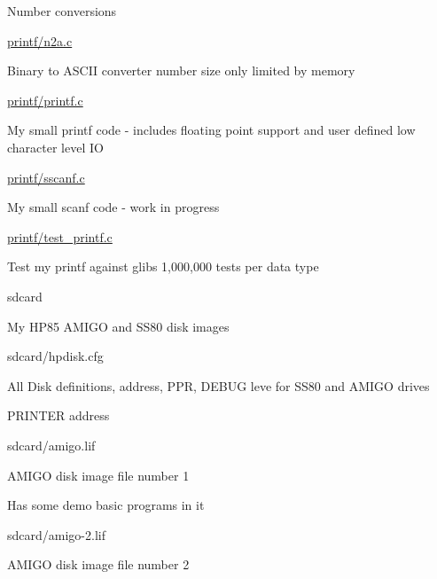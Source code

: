 \begin{DoxyItemize}
\begin{DoxyItemize}
\begin{DoxyItemize}
\item Number conversions
\end{DoxyItemize}
\item \hyperlink{n2a_8c}{printf/n2a.\+c}
\begin{DoxyItemize}
\item Binary to A\+S\+C\+II converter number size only limited by memory
\end{DoxyItemize}
\item \hyperlink{printf_8c}{printf/printf.\+c}
\begin{DoxyItemize}
\item My small printf code -\/ includes floating point support and user defined low character level IO
\end{DoxyItemize}
\item \hyperlink{sscanf_8c}{printf/sscanf.\+c}
\begin{DoxyItemize}
\item My small scanf code -\/ work in progress
\end{DoxyItemize}
\item \hyperlink{test__printf_8c}{printf/test\+\_\+printf.\+c}
\begin{DoxyItemize}
\item Test my printf against glibs 1,000,000 tests per data type
\end{DoxyItemize}
\end{DoxyItemize}
\item sdcard
\begin{DoxyItemize}
\item My H\+P85 A\+M\+I\+GO and S\+S80 disk images
\begin{DoxyItemize}
\item sdcard/hpdisk.\+cfg
\begin{DoxyItemize}
\item All Disk definitions, address, P\+PR, D\+E\+B\+UG leve for S\+S80 and A\+M\+I\+GO drives
\item P\+R\+I\+N\+T\+ER address
\end{DoxyItemize}
\item sdcard/amigo.\+lif
\begin{DoxyItemize}
\item A\+M\+I\+GO disk image file number 1
\item Has some demo basic programs in it
\end{DoxyItemize}
\item sdcard/amigo-\/2.\+lif
\begin{DoxyItemize}
\item A\+M\+I\+GO disk image file number 2

\end{DoxyItemize}
\end{DoxyItemize}
\end{DoxyItemize}
\end{DoxyItemize}
